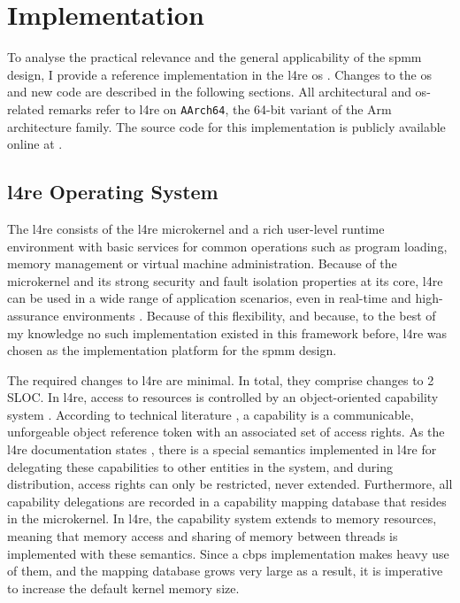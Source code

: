 \chapter{Implementation}
\label{chap:implementation}

To analyse the practical relevance and the general applicability of the \ac{spmm} design, I provide a reference implementation in the \ac{l4re} \ac{os} \cite{l4re}.
Changes to the \ac{os} and new code are described in the following sections.
All architectural and \ac{os}-related remarks refer to \ac{l4re} on \texttt{AArch64}, the 64-bit variant of the Arm architecture family.
The source code for this implementation is publicly available online at \cite{l4re-spm}.

\section{\acs{l4re} Operating System}
\label{sec:l4re-os}

The \acl{l4re} consists of the \acs{l4re} microkernel and a rich user-level runtime environment with basic services for common operations such as program loading, memory management or virtual machine administration.
Because of the microkernel and its strong security and fault isolation properties at its core, \ac{l4re} can be used in a wide range of application scenarios, even in real-time and high-assurance environments \cite{l4re-industries}.
Because of this flexibility, and because, to the best of my knowledge no such implementation existed in this framework before, \ac{l4re} was chosen as the implementation platform for the \ac{spmm} design.

The required changes to \ac{l4re} are minimal.
In total, they comprise changes to 2 SLOC.
In \ac{l4re}, access to resources is controlled by an object-oriented capability system \cite{l4re-capabilities}.
According to technical literature \cite{capability1999}, a capability is a communicable, unforgeable object reference token with an associated set of access rights.
As the \ac{l4re} documentation states \cite{l4re-capabilities}, there is a special semantics implemented in \ac{l4re} for delegating these capabilities to other entities in the system, and during distribution, access rights can only be restricted, never extended.
Furthermore, all capability delegations are recorded in a capability mapping database that resides in the microkernel.
In \ac{l4re}, the capability system extends to memory resources, meaning that memory access and sharing of memory between threads is implemented with these semantics.
Since a \ac{cbps} implementation makes heavy use of them, and the mapping database grows very large as a result, it is imperative to increase the default kernel memory size.

